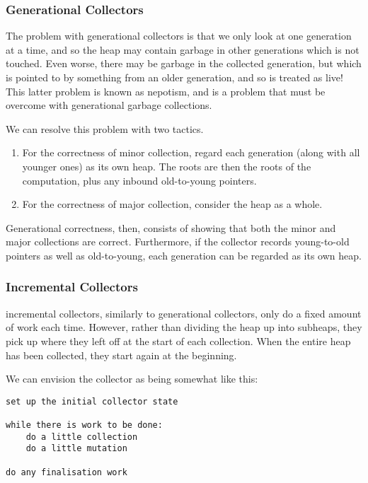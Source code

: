 \subsubsection{Generational Collectors}

The problem with generational collectors is that we only look at one
generation at a time, and so the heap may contain garbage in other
generations which is not touched. Even worse, there may be
\gls{garbage} in the collected generation, but which is pointed to by
something from an older generation, and so is treated as live! This
latter problem is known as \gls{nepotism}, and is a problem that must
be overcome with \glspl{generational garbage collection}.

We can resolve this problem with two tactics.

\begin{enumerate}
  \item For the correctness of minor collection, regard each
    generation (along with all younger ones) as its own
    \gls{heap}. The \glspl{root} are then the \glspl{root} of the
    computation, plus any inbound \glspl{old-to-young pointer}.

  \item For the correctness of major collection, consider the
    \gls{heap} as a whole.
\end{enumerate}

Generational correctness, then, consists of showing that both the
minor and major collections are correct. Furthermore, if the collector
records young-to-old pointers as well as old-to-young, each generation
can be regarded as its own heap.

\subsubsection{Incremental Collectors}

\Glspl{incremental collector}, similarly to generational collectors, only do
a fixed amount of work each time. However, rather than dividing the
heap up into subheaps, they pick up where they left off at the start
of each collection. When the entire heap has been collected, they
start again at the beginning.

We can envision the collector as being somewhat like this:

\begin{verbatim}
set up the initial collector state

while there is work to be done:
    do a little collection
    do a little mutation

do any finalisation work
\end{verbatim}

